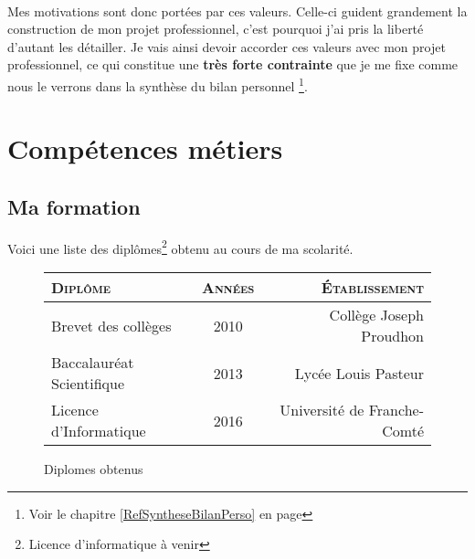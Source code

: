 \documentclass[a4paper,12pt, draft]{report}
\newcommand{\tabTitle}[1]{\hfill{} \textsc{#1} \hfill{} }
\begin{document}

\paragraph{}
Mes motivations sont donc portées par ces valeurs. Celle-ci guident grandement la construction de mon projet professionnel, c'est pourquoi j'ai pris la liberté d'autant les détailler.
Je vais ainsi devoir accorder ces valeurs avec mon projet professionnel, ce qui constitue une \textbf{très forte contrainte} que je me fixe comme nous le verrons dans la synthèse du bilan personnel \footnote{Voir le chapitre \ref{RefSyntheseBilanPerso} en page \pageref{RefSyntheseBilanPerso}}.

\newpage

\section{Compétences métiers}
\subsection{Ma formation}
Voici une liste des diplômes\footnote{Licence d'informatique à venir} obtenu au cours de ma scolarité.
\begin{figure}[h]
\begin{center}
\begin{tabular}{|l|c|r|}
\hline
\tabTitle{Diplôme} & \tabTitle{Années} & \tabTitle{Établissement}\\
\hline
Brevet des collèges & 2010 & Collège Joseph Proudhon \\
\hline
Baccalauréat Scientifique & 2013 & Lycée Louis Pasteur \\
\hline
Licence d'Informatique & 2016 & Université de Franche-Comté\\
\hline
\end{tabular}
\end{center}
\caption{Diplomes obtenus} 
\end{figure}
\end{document}
